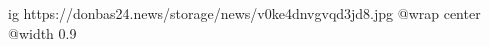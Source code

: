  
 
 
 
 

\ifcmt
  ig https://donbas24.news/storage/news/v0ke4dnvgvqd3jd8.jpg
  @wrap center
  @width 0.9
\fi
